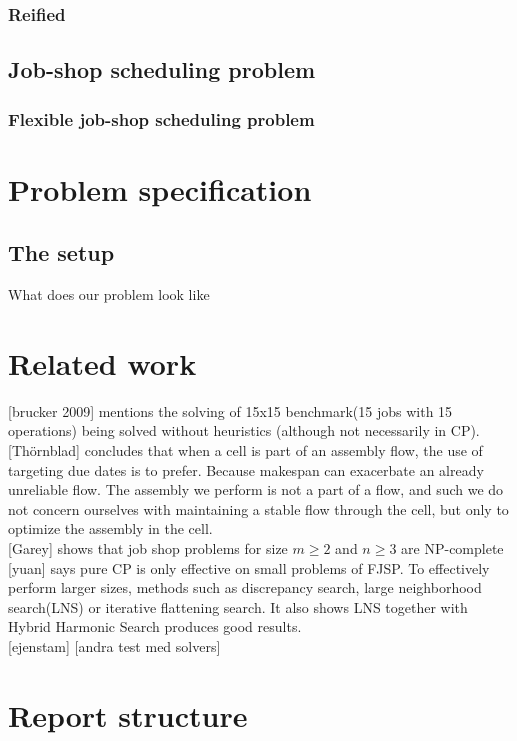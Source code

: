 \cite{tsang_1993}
\cite{marriott_1998}
\cite{mz_manual}

\subsubsection{Reified}

\subsection{Job-shop scheduling problem}
\subsubsection{Flexible job-shop scheduling problem}



\section{Problem specification}
\subsection{The setup}
What does our problem look like

\section{Related work}
[brucker 2009] mentions the solving of 15x15 benchmark(15 jobs with 15 operations) being solved without heuristics (although not necessarily in CP).\cite{brucker_2009}
\\

[Thörnblad] concludes that when a cell is part of an assembly flow, the use of targeting due dates is to prefer. Because makespan can exacerbate an already unreliable flow. The assembly we perform is not a part of a flow, and such we do not concern ourselves with maintaining a stable flow through the cell, but only to optimize the assembly in the cell.\cite{thornblad_2013}
\\

[Garey] shows that job shop problems for size $m \geq 2$ and $n \geq 3$ are NP-complete \cite{garey_1976}
\\

[yuan] says pure CP is only effective on small problems of FJSP. To effectively perform larger sizes, methods such as discrepancy search, large neighborhood search(LNS) or iterative flattening search. It also shows LNS together with Hybrid Harmonic Search produces good results.\cite{yuan_2013}
\\

[ejenstam]
[andra test med solvers]

\section{Report structure}
